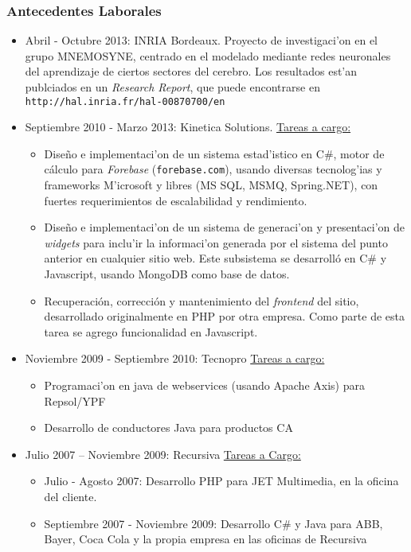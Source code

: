 \subsubsection*{Antecedentes Laborales}
\begin{itemize}
	\item Abril - Octubre 2013: INRIA Bordeaux.
		\subitem Proyecto de investigaci'on en el grupo MNEMOSYNE, centrado en el modelado mediante
		redes neuronales del aprendizaje de ciertos sectores del cerebro.  Los resultados est'an
		publciados en un \emph{Research Report}, que puede encontrarse en
		\texttt{http://hal.inria.fr/hal-00870700/en}
	\item Septiembre 2010 - Marzo 2013: Kinetica Solutions.
		\subitem \underline{Tareas a cargo:}
		\begin{itemize}
			\item Dise\~no e implementaci'on de un sistema estad'istico en C\#,
				motor de cálculo para \emph{Forebase} (\texttt{forebase.com}), usando
				diversas tecnolog'ias y frameworks M'icrosoft y libres (MS SQL, MSMQ,
				Spring.NET), con fuertes requerimientos de escalabilidad y rendimiento.
			\item Dise\~no e implementaci'on de un sistema de generaci'on y presentaci'on
				de \emph{widgets} para inclu'ir la informaci'on generada por el sistema del
				punto anterior en cualquier sitio web.  Este subsistema se desarrolló en C\# y
				Javascript, usando MongoDB como base de datos.
			\item Recuperación, corrección y mantenimiento del \emph{frontend} del sitio,
				desarrollado originalmente en PHP por otra empresa.  Como parte de esta tarea se
				agrego funcionalidad en Javascript.
		\end{itemize}
	\item Noviembre 2009 - Septiembre 2010: Tecnopro
		\subitem \underline{Tareas a cargo:}
		\begin{itemize}
			\item Programaci'on en java de webservices (usando Apache Axis) para Repsol/YPF
			\item Desarrollo de conductores Java para productos CA
		\end{itemize}
	\item Julio 2007 -- Noviembre 2009: Recursiva
		\subitem \underline{Tareas a Cargo:}
			\begin{itemize}
				\item Julio - Agosto 2007: Desarrollo PHP para JET Multimedia,
					en la oficina del cliente.
				\item Septiembre 2007 - Noviembre 2009: Desarrollo C\# y Java para ABB,
					Bayer, Coca Cola y la propia empresa en las oficinas de
					Recursiva
			\end{itemize}


\end{itemize}
